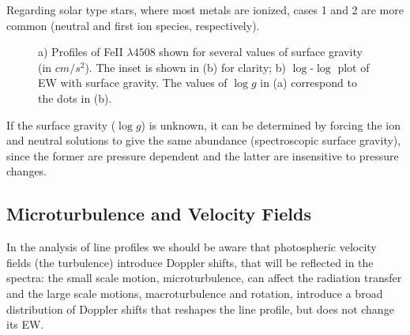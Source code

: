 \documentclass[dvips,12pt,a4paper]{report}
\begin{document}
{Regarding solar type stars, where most metals are ionized, cases 1 and 2 are more common (neutral and first ion species, respectively).

\begin{figure}[h]
\centering
\caption[Line Profiles of FeII with $\log g$] {a) Profiles of FeII $\lambda4508$ shown for several values of surface gravity (in $cm/s^2$). The inset is shown in (b) for clarity; b) $\log$-$\log$ plot of EW with surface gravity. The values of $\log g$ in (a) correspond to the dots in (b).}
\label{cogpmt}
\end{figure}

If the surface gravity ($\log g$) is unknown, it can be determined by forcing the ion and neutral solutions to give the same abundance (spectroscopic surface gravity), since the former are pressure dependent and the latter are insensitive to pressure changes.

\subsection{Microturbulence and Velocity Fields}
\label{microturbo}
In the analysis of line profiles we should be aware that photospheric velocity fields (the turbulence) introduce Doppler shifts, that will be reflected in the spectra: the small scale motion, microturbulence, can affect the radiation transfer and the large scale motions, macroturbulence and rotation, introduce a broad distribution of Doppler shifts that reshapes the line profile, but does not change its EW. %

}
\end{document}
